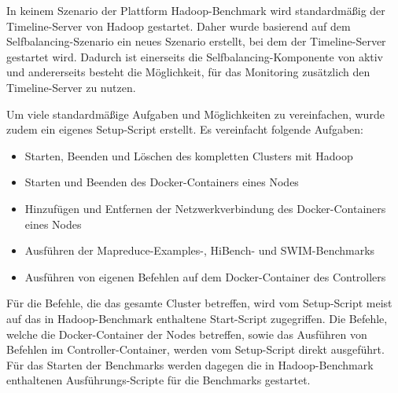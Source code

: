 In keinem Szenario der Plattform Hadoop-Benchmark wird standardmäßig der Timeline-Server von Hadoop gestartet. Daher wurde basierend auf dem Selfbalancing-Szenario ein neues Szenario erstellt, bei dem der Timeline-Server gestartet wird. Dadurch ist einerseits die Selfbalancing-Komponente von \citeauthor{zhang2016} aktiv und andererseits besteht die Möglichkeit, für das Monitoring zusätzlich den Timeline-Server zu nutzen.

Um viele standardmäßige Aufgaben und Möglichkeiten zu vereinfachen, wurde zudem ein eigenes Setup-Script erstellt. Es vereinfacht folgende Aufgaben:

\begin{itemize}[noitemsep]
    \item Starten, Beenden und Löschen des kompletten Clusters mit Hadoop
    \item Starten und Beenden des Docker-Containers eines Nodes
    \item Hinzufügen und Entfernen der Netzwerkverbindung des Docker-Containers eines Nodes
    \item Ausführen der Mapreduce-Examples-, HiBench- und SWIM-Benchmarks
    \item Ausführen von eigenen Befehlen auf dem Docker-Container des Controllers
\end{itemize}

Für die Befehle, die das gesamte Cluster betreffen, wird vom Setup-Script meist auf das in Hadoop-Benchmark enthaltene Start-Script zugegriffen. Die Befehle, welche die Docker-Container der Nodes betreffen, sowie das Ausführen von Befehlen im Controller-Container, werden vom Setup-Script direkt ausgeführt. Für das Starten der Benchmarks werden dagegen die in Hadoop-Benchmark enthaltenen Ausführungs-Scripte für die Benchmarks gestartet.